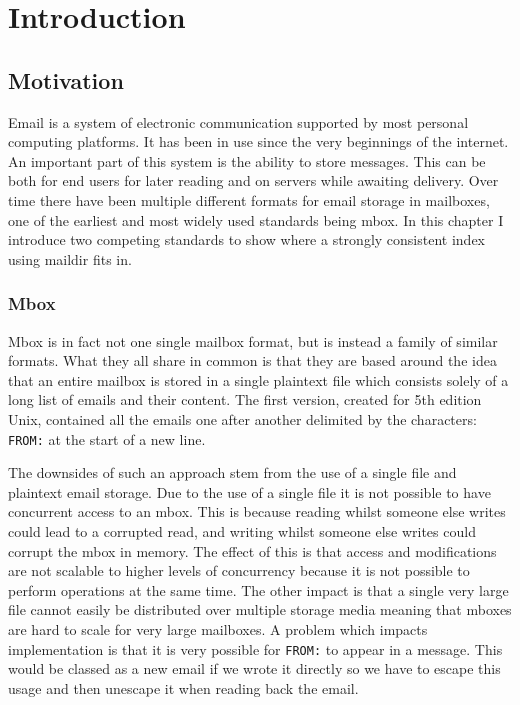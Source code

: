 \chapter{Introduction}

\section{Motivation}

Email is a system of electronic communication supported by most personal computing platforms. It has been in use since the very beginnings of the internet. An important part of this system is the ability to store messages. This can be both for end users for later reading and on servers while awaiting delivery. Over time there have been multiple different formats for email storage in mailboxes, one of the earliest and most widely used standards being mbox. In this chapter I introduce two competing standards to show where a strongly consistent index using maildir fits in.

\subsection{Mbox}

Mbox is in fact not one single mailbox format, but is instead a family of similar formats. What they all share in common is that they are based around the idea that an entire mailbox is stored in a single plaintext file which consists solely of a long list of emails and their content. The first version, created for 5th edition Unix, contained all the emails one after another delimited by the characters: \texttt{FROM:} at the start of a new line.

The downsides of such an approach stem from the use of a single file and plaintext email storage. Due to the use of a single file it is not possible to have concurrent access to an mbox. This is because reading whilst someone else writes could lead to a corrupted read, and writing whilst someone else writes could corrupt the mbox in memory. The effect of this is that access and modifications are not scalable to higher levels of concurrency because it is not possible to perform operations at the same time. The other impact is that a single very large file cannot easily be distributed over multiple storage media meaning that mboxes are hard to scale for very large mailboxes. A problem which impacts implementation is that it is very possible for \texttt{FROM:} to appear in a message. This would be classed as a new email if we wrote it directly so we have to escape this usage and then unescape it when reading back the email.

